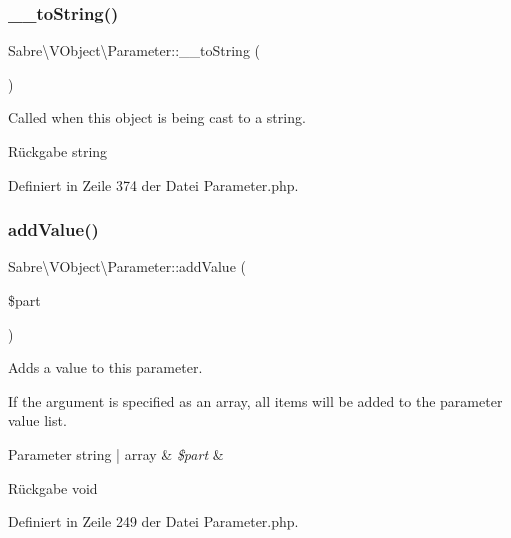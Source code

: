 \subsubsection{\texorpdfstring{\+\_\+\+\_\+to\+String()}{\_\_toString()}}
{\footnotesize\ttfamily Sabre\textbackslash{}\+V\+Object\textbackslash{}\+Parameter\+::\+\_\+\+\_\+to\+String (\begin{DoxyParamCaption}{ }\end{DoxyParamCaption})}

Called when this object is being cast to a string.

\begin{DoxyReturn}{Rückgabe}
string 
\end{DoxyReturn}


Definiert in Zeile 374 der Datei Parameter.\+php.

\mbox{\label{class_sabre_1_1_v_object_1_1_parameter_aed4ef3e73a4dcdb57161c403cbaddd0e}} 
\subsubsection{\texorpdfstring{add\+Value()}{addValue()}}
{\footnotesize\ttfamily Sabre\textbackslash{}\+V\+Object\textbackslash{}\+Parameter\+::add\+Value (\begin{DoxyParamCaption}\item[{}]{\$part }\end{DoxyParamCaption})}

Adds a value to this parameter.

If the argument is specified as an array, all items will be added to the parameter value list.


\begin{DoxyParams}[1]{Parameter}
string | array & {\em \$part} & \\
\hline
\end{DoxyParams}
\begin{DoxyReturn}{Rückgabe}
void 
\end{DoxyReturn}


Definiert in Zeile 249 der Datei Parameter.\+php.

\mbox{\label{class_sabre_1_1_v_object_1_1_parameter_aa9acea2a752ecd0f4c22e4af4a73afa4}} 

